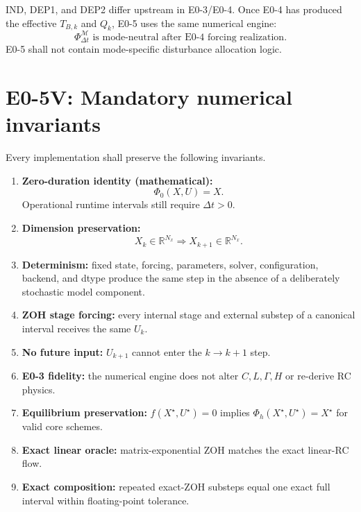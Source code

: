 \documentclass[11pt]{article}
\newcommand{\R}{\mathbb{R}}
\begin{document}
IND, DEP1, and DEP2 differ upstream in E0-3/E0-4. Once E0-4 has produced the
effective $T_{B,k}$ and $Q_k$, E0-5 uses the same numerical engine:
\[
\boxed{
\Phi_{\Delta t}^{\mathcal M}
\text{ is mode-neutral after E0-4 forcing realization}.}
\]
E0-5 shall not contain mode-specific disturbance allocation logic.

\section{E0-5V: Mandatory numerical invariants}

Every implementation shall preserve the following invariants.

\begin{enumerate}[leftmargin=*]
\item \textbf{Zero-duration identity (mathematical):}
\[
\Phi_0(X,U)=X.
\]
Operational runtime intervals still require $\Delta t>0$.

\item \textbf{Dimension preservation:}
\[
X_k\in\R^{N_x}\Rightarrow X_{k+1}\in\R^{N_x}.
\]

\item \textbf{Determinism:} fixed state, forcing, parameters, solver,
configuration, backend, and dtype produce the same step in the absence of a
deliberately stochastic model component.

\item \textbf{ZOH stage forcing:} every internal stage and external substep of a
canonical interval receives the same $U_k$.

\item \textbf{No future input:} $U_{k+1}$ cannot enter the $k\to k+1$ step.

\item \textbf{E0-3 fidelity:} the numerical engine does not alter $C,L,\Gamma,H$
or re-derive RC physics.

\item \textbf{Equilibrium preservation:}
$f(X^\star,U^\star)=0$ implies $\Phi_h(X^\star,U^\star)=X^\star$ for valid core
schemes.

\item \textbf{Exact linear oracle:} matrix-exponential ZOH matches the exact
linear-RC flow.

\item \textbf{Exact composition:} repeated exact-ZOH substeps equal one exact
full interval within floating-point tolerance.


\end{enumerate}
\end{document}
